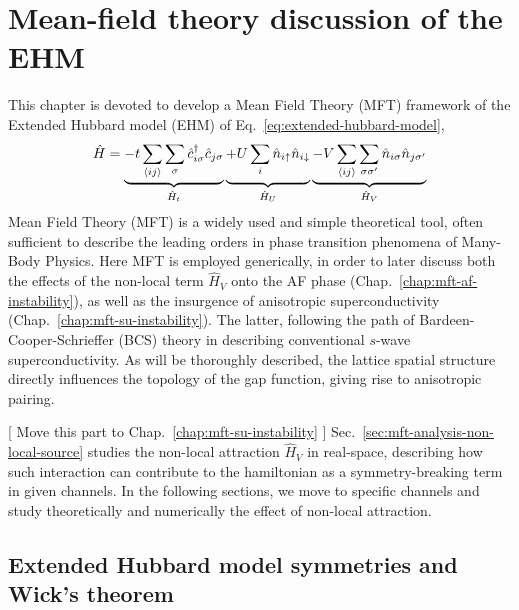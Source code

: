  \def\GraphicsFolder{parts/mft-analysis/chapters/mft-discussion/pictures}
\chapter{Mean-field theory discussion of the EHM}\label{chap:mft-discussion}

This chapter is devoted to develop a Mean Field Theory (MFT) framework of the Extended Hubbard model (EHM) of Eq.~\eqref{eq:extended-hubbard-model},
\[
	\hat H =
	\underbrace{
		-t \sum_{\langle ij \rangle} \sum_\sigma \hat c_{i\sigma}^\dagger \hat c_{j\sigma}
	}_{\hat H_t} \underbrace{
		+U \sum_i \hat n_{i\uparrow} \hat n_{i\downarrow}
		\vphantom{
			\sum_{\langle ij \rangle}
		}
	}_{\hat H_U}
	\underbrace{
		- V \sum_{\langle ij \rangle} \sum_{\sigma \sigma'} \hat n_{i\sigma} \hat n_{j\sigma'}
	}_{\hat H_V}
\]
Mean Field Theory (MFT) is a widely used and simple theoretical tool, often sufficient to describe the leading orders in phase transition phenomena of Many-Body Physics. Here MFT is employed generically, in order to later discuss both the effects of the non-local term $\hat H_V$ onto the AF phase (Chap.~\ref{chap:mft-af-instability}), as well as the insurgence of anisotropic superconductivity (Chap.~\ref{chap:mft-su-instability}). The latter, following the path of Bardeen-Cooper-Schrieffer (BCS) theory in describing conventional $s$-wave superconductivity. As will be thoroughly described, the lattice spatial structure directly influences the topology of the gap function, giving rise to anisotropic pairing.

{
	\color{tabred}[ Move this part to Chap.~\ref{chap:mft-su-instability} ]
	Sec.~\ref{sec:mft-analysis-non-local-source} studies the non-local attraction $\hat H_V$ in real-space, describing how such interaction can contribute to the hamiltonian as a symmetry-breaking term in given channels. In the following sections, we move to specific channels and study theoretically and numerically the effect of non-local attraction.
}

\section{Extended Hubbard model symmetries and Wick's theorem}\label{sec:ehm-symmetries}

